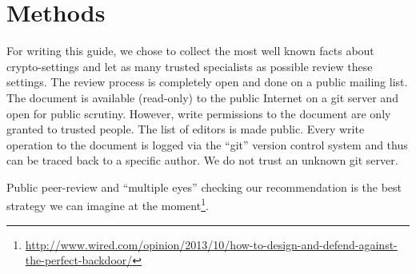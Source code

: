 \section{Methods}
\label{section:Methods}


For writing this guide, we chose to collect the most well known facts about crypto-settings
and let as many trusted specialists as possible review these settings.  The
review process is completely open and done on a public mailing list. The
document is available (read-only) to the public Internet on a git server and
open for public scrutiny. However, write permissions to the document are only
granted to trusted people. The list of editors is made public.  Every write
operation to the document is logged via the ``git'' version control system and
thus can be traced back to a specific author.  We do not trust an unknown git
server. 

Public peer-review and  ``multiple eyes'' checking our recommendation is the best
strategy we can imagine at the moment\footnote{\url{http://www.wired.com/opinion/2013/10/how-to-design-and-defend-against-the-perfect-backdoor/}}.

